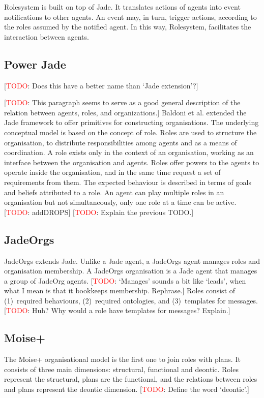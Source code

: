 \documentclass{article}
\newcommand{\todo}[1]{[\textcolor{red}{TODO}: #1]}
\begin{document}
Rolesystem is built on top of Jade. It translates actions of
agents into event notifications to other agents. An event may,
in turn, trigger actions, according to the roles assumed by
the notified agent. In this way, Rolesystem, facilitates the
interaction between agents.

\subsection{Power Jade}

\todo{Does this have a better name than `Jade extension'?}

\todo{This paragraph seems to serve as a good general description of the
relation between agents, roles, and organizations.} Baldoni et al.
\cite{conf/mates/BaldoniBGGT08} extended the Jade framework to offer primitives
for constructing organisations. The underlying conceptual model is based on the
concept of role. Roles are used to structure the organisation, to distribute
responsibilities among agents and as a means of coordination. A role exists
only in the context of an organisation, working as an interface between the
organisation and agents. Roles offer powers to the agents to operate inside the
organisation, and in the same time request a set of requirements from them. The
expected behaviour is described in terms of goals and beliefs attributed to a
role. An agent can play multiple roles in an organisation but not
simultaneously, only one role at a time can be active.  \todo{addDROPS}
\todo{Explain the previous TODO.}

\subsection{JadeOrgs}

JadeOrgs \cite{madrigal2009adding} extends Jade. Unlike a Jade agent, a
JadeOrgs agent manages roles and organisation membership. A JadeOrgs
organisation is a Jade agent that manages a group of JadeOrg agents.
\todo{`Manages' sounds a bit like `leads', when what I mean is that it
bookkeeps membership. Rephrase.} Roles consist of (1)~required behaviours,
(2)~required ontologies, and (3)~templates for messages. \todo{Huh? Why would a
role have templates for messages? Explain.}

\subsection{Moise+} 

The Moise+ \cite{conf/sbia/HubnerSB02} organisational model is the first one to
join roles with plans. It consists of three main dimensions: structural,
functional and deontic. Roles represent the structural, plans are the
functional, and the relations between roles and plans represent the deontic
dimension. \todo{Define the word `deontic'.}
\end{document}
